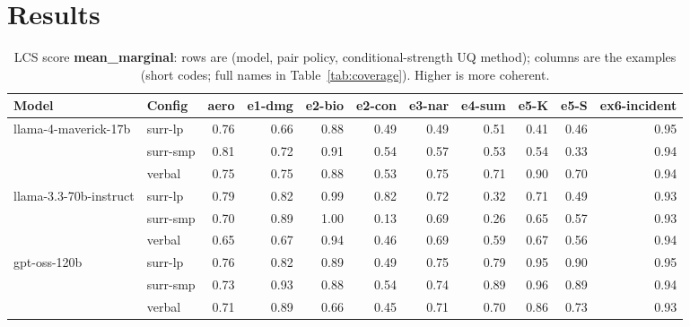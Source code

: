 \documentclass[11pt]{article}
\begin{document}
\section{Results}

\begin{table}[htbp]
\centering
\footnotesize
\setlength{\tabcolsep}{3.5pt}
\caption{LCS score \textbf{mean\_marginal}: rows are (model, pair policy, conditional-strength UQ method); columns are the examples (short codes; full names in Table~\ref{tab:coverage}). Higher is more coherent.}
\label{tab:mean-marginal}
\begin{tabular}{llrrrrrrrrr}
\toprule
\textbf{Model} & \textbf{Config} & \textbf{aero} & \textbf{e1-dmg} & \textbf{e2-bio} & \textbf{e2-con} & \textbf{e3-nar} & \textbf{e4-sum} & \textbf{e5-K} & \textbf{e5-S} & \textbf{ex6-incident} \\
\midrule
llama-4-maverick-17b & surr-lp & 0.76 & 0.66 & 0.88 & 0.49 & 0.49 & 0.51 & 0.41 & 0.46 & 0.95 \\
 & surr-smp & 0.81 & 0.72 & 0.91 & 0.54 & 0.57 & 0.53 & 0.54 & 0.33 & 0.94 \\
 & verbal & 0.75 & 0.75 & 0.88 & 0.53 & 0.75 & 0.71 & 0.90 & 0.70 & 0.94 \\
\midrule
llama-3.3-70b-instruct & surr-lp & 0.79 & 0.82 & 0.99 & 0.82 & 0.72 & 0.32 & 0.71 & 0.49 & 0.93 \\
 & surr-smp & 0.70 & 0.89 & 1.00 & 0.13 & 0.69 & 0.26 & 0.65 & 0.57 & 0.93 \\
 & verbal & 0.65 & 0.67 & 0.94 & 0.46 & 0.69 & 0.59 & 0.67 & 0.56 & 0.94 \\
\midrule
gpt-oss-120b & surr-lp & 0.76 & 0.82 & 0.89 & 0.49 & 0.75 & 0.79 & 0.95 & 0.90 & 0.95 \\
 & surr-smp & 0.73 & 0.93 & 0.88 & 0.54 & 0.74 & 0.89 & 0.96 & 0.89 & 0.94 \\
 & verbal & 0.71 & 0.89 & 0.66 & 0.45 & 0.71 & 0.70 & 0.86 & 0.73 & 0.93 \\
\bottomrule
\end{tabular}
\end{table}
\end{document}
